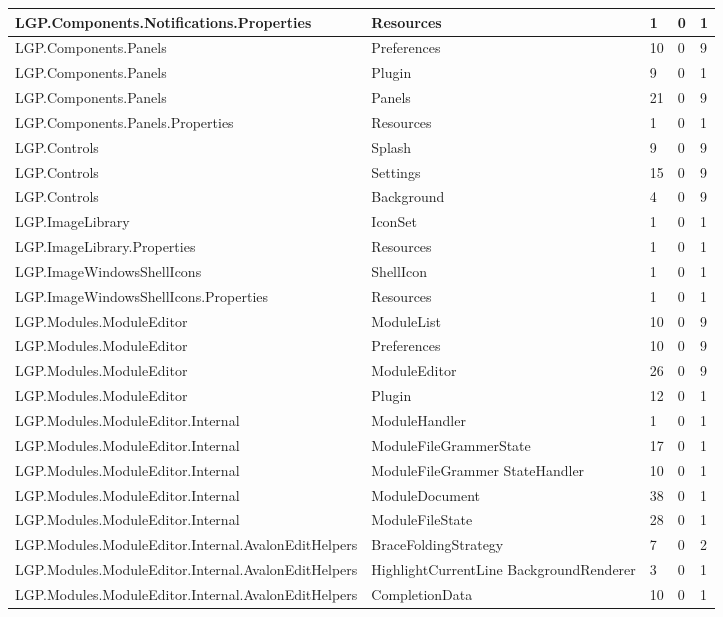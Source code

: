 \begin{table}[h!t]
{\begin{tabular}{ | p{70mm} | p{33mm} | p{10mm} | p{10mm} | p{10mm}  | }
				LGP.Components.Notifications.Properties & Resources & 1     & 0     & 1  \\ \hline
				LGP.Components.Panels & Preferences & 10    & 0     & 9  \\ \hline
				LGP.Components.Panels & Plugin & 9     & 0     & 1  \\ \hline
				LGP.Components.Panels & Panels & \cellcolor{ored}21    & 0     & 9  \\ \hline
				LGP.Components.Panels.Properties & Resources & 1     & 0     & 1  \\ \hline
				LGP.Controls & Splash & 9     & 0     & 9  \\ \hline
				LGP.Controls & Settings & 15    & 0     & 9  \\ \hline
				LGP.Controls & Background & 4     & 0     & 9  \\ \hline
				LGP.ImageLibrary & IconSet & 1     & 0     & 1  \\ \hline
				LGP.ImageLibrary.Properties & Resources & 1     & 0     & 1  \\ \hline
				LGP.ImageWindowsShellIcons & ShellIcon & 1     & 0     & 1  \\ \hline
				LGP.ImageWindowsShellIcons.Properties & Resources & 1     & 0     & 1  \\ \hline
				LGP.Modules.ModuleEditor & ModuleList & 10    & 0     & 9  \\ \hline
				LGP.Modules.ModuleEditor & Preferences & 10    & 0     & 9  \\ \hline
				LGP.Modules.ModuleEditor & ModuleEditor & \cellcolor{ored}26    & 0     & 9  \\ \hline
				LGP.Modules.ModuleEditor & Plugin & 12    & 0     & 1  \\ \hline
				LGP.Modules.ModuleEditor.Internal & ModuleHandler & 1     & 0     & 1  \\ \hline
				LGP.Modules.ModuleEditor.Internal & ModuleFileGrammerState & \cellcolor{ored}17    & 0     & 1  \\ \hline
				LGP.Modules.ModuleEditor.Internal & ModuleFileGrammer\newline
													StateHandler & 10    & 0     & 1  \\ \hline
				LGP.Modules.ModuleEditor.Internal & ModuleDocument & \cellcolor{ored}38    & 0     & 1  \\ \hline	
				LGP.Modules.ModuleEditor.Internal & ModuleFileState & \cellcolor{ored}28    & 0     & 1  \\ \hline
				LGP.Modules.ModuleEditor.Internal.AvalonEditHelpers & BraceFoldingStrategy & 7     & 0     & 2  \\ \hline
				LGP.Modules.ModuleEditor.Internal.AvalonEditHelpers & HighlightCurrentLine\newline
																	  BackgroundRenderer & 3     & 0     & 1  \\ \hline
				LGP.Modules.ModuleEditor.Internal.AvalonEditHelpers & CompletionData & 10    & 0     & 1  \\ \hline				
				\end{tabular}}
				

\end{table}
